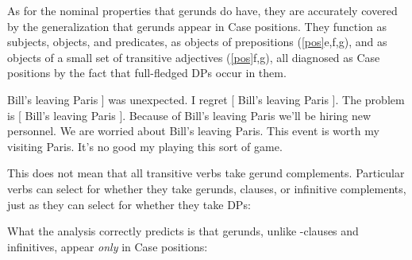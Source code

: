 \documentclass[output=paper,
modfonts
]{LSP/langsci}
\newcommand{\rfa}[2]{(\ref{#1}{#2})}
\begin{document}
As for the nominal properties that gerunds do have, they are accurately covered by the
generalization that gerunds appear in Case positions.  They function as subjects, objects, and
predicates, as objects of prepositions \rfa{pos}{e,f,g}, and as objects of a small set of
transitive adjectives \rfa{pos}{f,g}, all diagnosed as Case positions by the fact that
full-fledged DPs occur in them.
\begin{exe}
\ex\label{pos}
	\ea {[} Bill's leaving Paris ] was unexpected.
	\ex I regret [ Bill's leaving Paris ].
	\ex The problem is [ Bill's leaving Paris ].
	\ex Because of  Bill's leaving Paris we'll be hiring new personnel.
	\ex We are worried about Bill's leaving Paris.
	\ex This event is worth my visiting Paris.
	\ex It's no good my playing this sort of game.\footnotemark 
	\z  
\end{exe}
  This does not mean that all transitive verbs take gerund complements.
Particular verbs can select for whether they take gerunds, clauses, or infinitive
complements, just as they can select for whether they take DPs:
What the analysis correctly predicts is that gerunds, unlike -clauses and infinitives,
appear \textit{only} in Case positions:
\begin{exe}
\ex\label{nocase}
	\ea
		\begin{xlisti}[iiii.]
		\end{xlisti}
	\ex 
		\begin{xlisti}[iiii.]
		\end{xlisti}
	\ex 
		\begin{xlisti}[iiii.]
		\end{xlisti}
	\z  
\end{exe}
\end{document}
